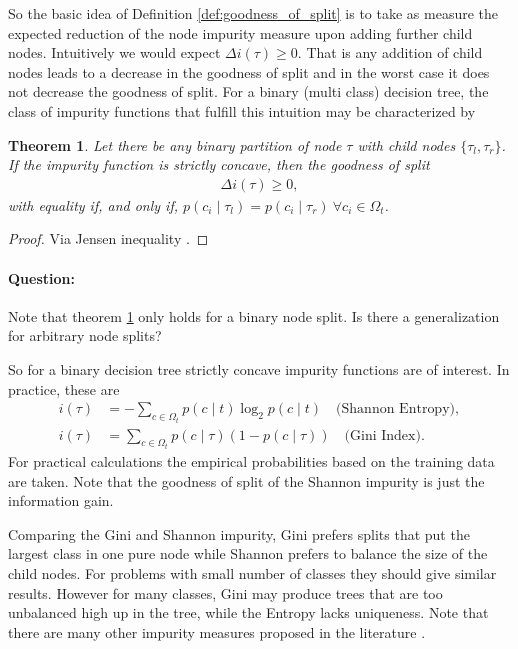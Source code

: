\documentclass[12pt,a4paper]{article}
\newtheorem{theorem}{Theorem}
\begin{document}
So the basic idea of Definition \ref{def:goodness_of_split} is to take as measure the expected reduction of the node impurity measure upon adding further child nodes. Intuitively we would expect $\Delta i(\tau) \geq 0$. That is any addition of child nodes leads to a decrease in the goodness of split and in the worst case it does not  decrease the goodness of split. For a binary (multi class) decision tree, the class of impurity functions that fulfill this intuition may be characterized by \cite[Appendix of Chap. 4]{cart84}
\begin{theorem} \label{thm:classification_impurity_functions}
	Let there be any binary partition of node $\tau$ with child nodes $\{\tau_l, \tau_r\}$. If the impurity function is strictly concave, then the goodness of split 
	\begin{align*}
	\Delta i(\tau) \geq 0,
	\end{align*}
	with equality if, and only if, $p(c_i \mid \tau_l) =  p(c_i \mid \tau_r) ~ \forall c_i \in \Omega_t$. 
\end{theorem}
\begin{proof}
	Via Jensen inequality \cite{Ripley1995}.
\end{proof}
\paragraph{Question:} Note that theorem \ref{thm:classification_impurity_functions} only holds for a binary node split. Is there a generalization for arbitrary node splits? 

So for a binary decision tree  strictly concave impurity functions are of interest. In practice, these are  
	\begin{align}
    i(\tau) &= - \sum_{c \in \Omega_t} p(c \mid t) \log_2 p(c \mid t) \quad \text{(Shannon Entropy)} \label{eq:shannon_impurity}, \\ 
    i(\tau) &= \sum_{c \in \Omega_t} p(c \mid \tau) (1 - p(c \mid \tau)) \quad \text{(Gini Index)} \label{eq:gini_impurity}.
    \end{align}
For practical calculations the empirical probabilities based on the training data are taken. Note that the goodness of split of the Shannon impurity is just the information gain. 

Comparing the Gini and Shannon impurity\cite{Breiman1996}, Gini prefers splits that put the largest class in one pure node while Shannon prefers to balance the size of the child nodes. For problems with small number of classes they should give similar results. However for many classes, Gini may produce trees that are too unbalanced high up in the tree, while the Entropy lacks uniqueness. Note that there are many other impurity measures proposed in the literature \cite{gini_vs_twoing, epub1833,  BERZAL200331}. 
\end{document}
